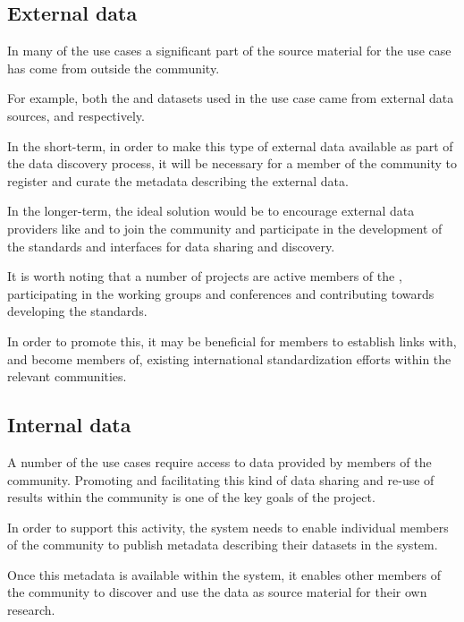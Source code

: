 \documentclass{article}
\begin{document}
\subsection{External data}

In many of the use cases a significant part of the source material for
the use case has come from outside the \cite{trop} community.

For example, both the \cite{saatchi-2011} and \cite{baccini-2012} datasets
used in the \cite{mitchard-2014} use case came from external data sources,
 and  respectively.

In the short-term, in order to make this type of external data available
as part of the \cite{trop} data discovery process, it will be necessary
for a member of the \cite{trop} community to register and curate the
\cite{trop} metadata describing the external data.

In the longer-term, the ideal solution would be to encourage external data
providers like  and  to join
the \cite{trop} community and participate in the development of the standards
and \cite{web-service} interfaces for data sharing and discovery.

It is worth noting that a number of \cite{nasa} projects are active members
of the \cite{ivoa}, participating in the working groups and conferences
and contributing towards developing the \cite{ivoa} standards.

In order to promote this, it may be beneficial for \cite{trop} members to
establish links with, and become members of,
existing international standardization efforts within the
relevant communities.
 
\subsection{Internal data}

A number of the \cite{trop} use cases require access to data provided by
members of the \cite{trop} community. Promoting and facilitating this kind
of data sharing and re-use of results within the \cite{trop} community is
one of the key goals of the \cite{trop} project.

In order to support this activity, the \cite{trop} system needs to enable
individual members of the \cite{trop} community to publish metadata describing
their datasets in the \cite{trop} system.

Once this metadata is available within the \cite{trop} system, it enables
other members of the \cite{trop} community to discover and use the data as
source material for their own research.
\end{document}
